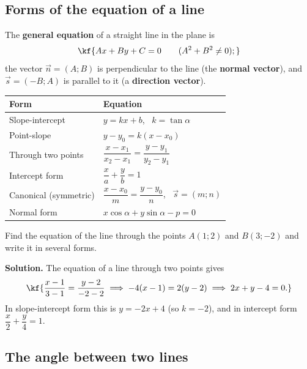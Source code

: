 
\subsection{Forms of the equation of a line}

\begin{tarif}
The \textbf{general equation} of a straight line in the plane is
\[\kf{Ax+By+C=0\qquad(A^2+B^2\neq0);}\]
the vector $\vec n=(A;B)$ is perpendicular to the line (the
\textbf{normal vector}), and $\vec s=(-B;A)$ is parallel to it (a
\textbf{direction vector}).
\end{tarif}

\begin{center}
\small
\begin{tabular}{|p{4.3cm}|p{5.2cm}|}
\hline
\textbf{Form} & \textbf{Equation}\\ \hline
Slope-intercept & $y=kx+b$, \ $k=\tan\alpha$\\ \hline
Point-slope & $y-y_0=k(x-x_0)$\\ \hline
Through two points & $\dfrac{x-x_1}{x_2-x_1}=\dfrac{y-y_1}{y_2-y_1}$\\[6pt] \hline
Intercept form & $\dfrac{x}{a}+\dfrac{y}{b}=1$\\[6pt] \hline
Canonical (symmetric) & $\dfrac{x-x_0}{m}=\dfrac{y-y_0}{n}$, \ $\vec s=(m;n)$\\[6pt] \hline
Normal form & $x\cos\alpha+y\sin\alpha-p=0$\\ \hline
\end{tabular}
\end{center}

\begin{misol}
Find the equation of the line through the points $A(1;2)$ and $B(3;-2)$
and write it in several forms.

\textbf{Solution.} The equation of a line through two points gives
\[\kf{\frac{x-1}{3-1}=\frac{y-2}{-2-2}\;\Longrightarrow\;-4(x-1)=2(y-2)
\;\Longrightarrow\;2x+y-4=0 .}\]
In slope-intercept form this is $y=-2x+4$ (so $k=-2$), and in intercept
form $\dfrac{x}{2}+\dfrac{y}{4}=1$.
\end{misol}

\subsection{The angle between two lines}

